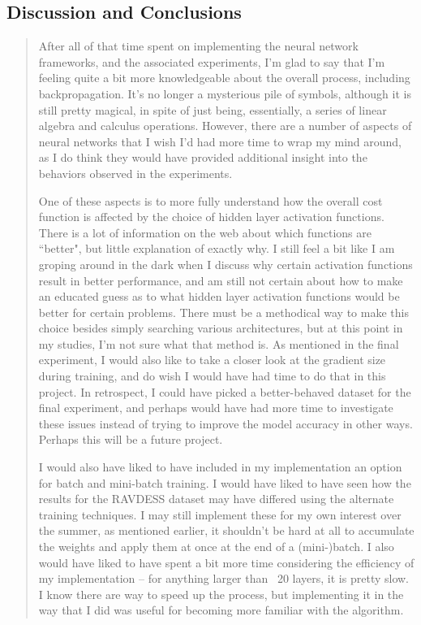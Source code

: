 \documentclass{article}
\begin{document}
\subsection*{Discussion and Conclusions}
\begin{quote}
\setlength{\parindent}{10ex}
\quad\quad\quad\quad After all of that time spent on implementing the neural network frameworks, and the associated experiments, I'm glad to say that I'm feeling quite a bit more knowledgeable about the overall process, including backpropagation. It's no longer a mysterious pile of symbols, although it is still pretty magical, in spite of just being, essentially, a series of linear algebra and calculus operations. However, there are a number of aspects of neural networks that I wish I'd had more time to wrap my mind around, as I do think they would have provided additional insight into the behaviors observed in the experiments.

One of these aspects is to more fully understand how the overall cost function is affected by the choice of hidden layer activation functions. There is a lot of information on the web about which functions are ``better", but little explanation of exactly why. I still feel a bit like I am groping around in the dark when I discuss why certain activation functions result in better performance, and am still not certain about how to make an educated guess as to what hidden layer activation functions would be better for certain problems. There must be a methodical way to make this choice besides simply searching various architectures, but at this point in my studies, I'm not sure what that method is. As mentioned in the final experiment, I would also like to take a closer look at the gradient size during training, and do wish I would have had time to do that in this project. In retrospect, I could have picked a better-behaved dataset for the final experiment, and perhaps would have had more time to investigate these issues instead of trying to improve the model accuracy in other ways. Perhaps this will be a future project.

I would also have liked to have included in my implementation an option for batch and mini-batch training. I would have liked to have seen how the results for the RAVDESS dataset may have differed using the alternate training techniques. I may still implement these for my own interest over the summer, as mentioned earlier, it shouldn't be hard at all to accumulate the weights and apply them at once at the end of a (mini-)batch. I also would have liked to have spent a bit more time considering the efficiency of my implementation -- for anything larger than ~20 layers, it is pretty slow. I know there are way to speed up the process, but implementing it in the way that I did was useful for becoming more familiar with the algorithm.


\end{quote}
\end{document}
